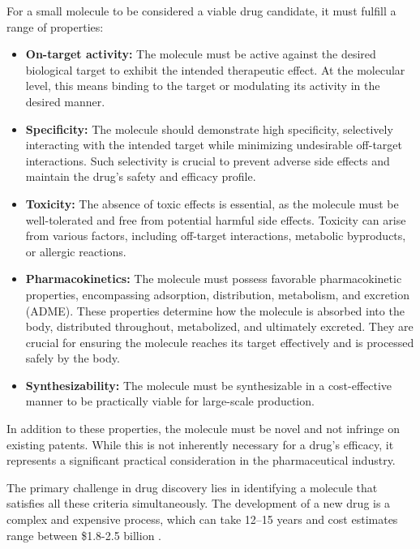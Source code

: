 For a small molecule to be considered a viable drug candidate, it must fulfill a range of properties:
\begin{itemize}
      \item \textbf{On-target activity:} The molecule must be active against the desired biological target to exhibit
            the intended therapeutic effect. At the molecular level, this means binding to the target or
            modulating its activity in the desired manner.
      \item \textbf{Specificity:} The molecule should demonstrate high specificity, selectively
            interacting with the intended target while minimizing undesirable off-target interactions. Such
            selectivity is crucial to prevent adverse side effects and maintain the drug's safety and efficacy
            profile.
      \item \textbf{Toxicity:} The absence of toxic effects is essential, as the molecule must be
            well-tolerated and free from potential harmful side effects. Toxicity can arise from various
            factors, including off-target interactions, metabolic byproducts, or allergic reactions.
      \item \textbf{Pharmacokinetics:} The molecule must possess favorable pharmacokinetic properties,
            encompassing adsorption, distribution, metabolism, and excretion (ADME). These properties determine
            how the molecule is absorbed into the body, distributed throughout, metabolized, and ultimately
            excreted. They are crucial for ensuring the molecule reaches its target effectively and is processed
            safely by the body.
      \item \textbf{Synthesizability:} The molecule must be synthesizable in a cost-effective manner to be
            practically viable for large-scale production.
\end{itemize}

In addition to these properties, the molecule must be novel and not infringe on existing patents.
While this is not inherently necessary for a drug's efficacy, it represents a significant practical
consideration in the pharmaceutical industry.

The primary challenge in drug discovery lies in identifying a molecule that satisfies all these
criteria simultaneously. The development of a new drug is a complex and expensive process, which can
take 12--15 years and cost estimates range between \$1.8-2.5 billion \citep{hughesPrinciplesEarlyDrug2011,paulHowImproveProductivity2010,dimasiInnovationPharmaceuticalIndustry2016}.

